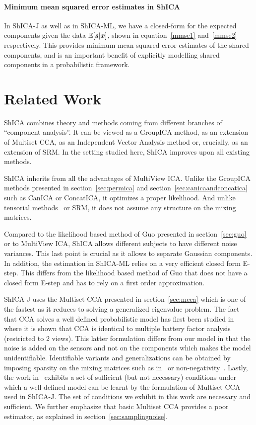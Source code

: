 \paragraph{Minimum mean squared error estimates in ShICA}
In ShICA-J as well as in ShICA-ML, we have a closed-form for the expected components given the data $\mathbb{E}[\boldsymbol{s} | \boldsymbol{x}]$, shown in equation~\eqref{mmse1} and~\eqref{mmse2} respectively. This provides minimum mean squared error estimates of the shared components, and is an important benefit of explicitly modelling shared components in a probabilistic framework.
\section{Related Work}
ShICA combines theory and methods coming from different branches of ``component analysis''. It can be viewed as a GroupICA method, as an extension of Multiset CCA, as an Independent Vector Analysis method or, crucially, as an extension of SRM. In the setting studied here, ShICA improves upon all existing methods.

ShICA inherits from all the advantages of MultiView ICA. Unlike the GroupICA
methods presented in section~\ref{sec:permica} and
section~\ref{sec:canicaandconcatica} such as CanICA or ConcatICA, it optimizes a
proper likelihood. And unlike tensorial
methods~\cite{beckmann2005tensorial} or SRM, it does not assume any structure on
the mixing matrices.

Compared to the likelihood based method of Guo presented in section~\ref{sec:guo} or to MultiView ICA, ShICA allows different subjects to have different noise
variances. This last point is crucial as it allows to separate Gaussian components. In addition, the estimation in ShICA-ML relies on a very efficient closed form
E-step. This differs from the likelihood based method of Guo that does not have
a closed form E-step and has to rely on a first order approximation.

ShICA-J uses the Multiset CCA presented in section~\ref{sec:mcca} which is one of the fastest as it reduces to solving a generalized eigenvalue problem. The fact that CCA solves a well defined probabilistic model has first been studied in~\cite{bach2005probabilistic} where it is shown that CCA is identical to multiple battery factor analysis~\cite{browne1980factor} (restricted to 2 views). This latter formulation differs from our model in that the noise is added on the sensors and not on the components which makes the model unidentifiable. Identifiable variants and
generalizations can be obtained by imposing sparsity on the mixing matrices such as in~\cite{archambeau2008sparse, klami2014group, witten2009extensions} or non-negativity~\cite{DELEUS2011143}.
Lastly, the work in~\cite{li2009joint} exhibits a set of sufficient (but not necessary) conditions under which a well defined model can be learnt by the formulation of Multiset CCA used in ShICA-J. The set of conditions we exhibit in this work are necessary and sufficient. We further emphasize that basic Multiset CCA provides a poor estimator, as explained in section~\ref{sec:samplingnoise}.

